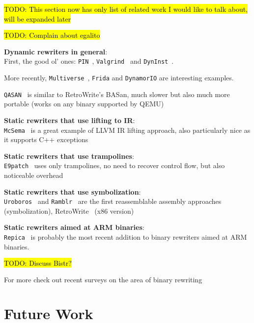 \documentclass[a4paper,11pt,oneside]{report}
\newcommand{\sysname}{RetroWrite\xspace}
\DeclareRobustCommand{\todo}[1]{{\sethlcolor{cyan}\hl{TODO: #1}}}
\begin{document}
{

\setlength{\parindent}{0cm}

\todo{This section now has only list of related work I would like to talk 
about, will be expanded later}


\todo{Complain about egalito}



\textbf{Dynamic rewriters in general}:\\
First, the good ol' ones: \texttt{PIN}~\cite{pin}, 
\texttt{Valgrind}~\cite{valgrind} and \texttt{DynInst}~\cite{dyninst}.

More recently, \texttt{Multiverse}~\cite{multiverse}, \texttt{Frida} and 
\texttt{DynamorIO} are interesting examples.

\texttt{QASAN}~\cite{qasan} is similar to \sysname's BASan, much slower but 
also much more portable (works on any binary supported by QEMU)



\textbf{Static rewriters that use lifting to IR}:\\
\texttt{McSema}~\cite{mcsema} is a great example of LLVM IR lifting approach, 
also particularly nice as it supports C++ exceptions

\textbf{Static rewriters that use trampolines}:\\
\texttt{E9patch}~\cite{e9patch} uses only trampolines, no need to recover 
control flow, but also noticeable overhead


\textbf{Static rewriters that use symbolization}:\\
\texttt{Uroboros}~\cite{uroboros} and \texttt{Ramblr}~\cite{ramblr} are the 
first reassemblable assembly approaches (symbolization), 
\sysname~\cite{dinesh20oakland} (x86 version)

\textbf{Static rewriters aimed at ARM binaries}:\\
\texttt{Repica}~\cite{repica} is probably the most recent addition to binary 
rewriters aimed at ARM binaries.  

\todo{Discuss Bistr?}~\cite{bistro}

For more check out recent surveys on the area of binary rewriting~\cite{binaryrewritingsurvey}

}

\chapter{Future Work}
\end{document}
